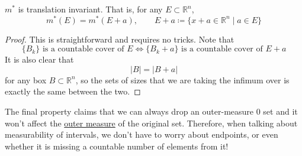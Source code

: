  \begin{theorem}
    \label{thm:translation-invariance-of-lebesgue-outer-measure}
    $m^\ast$ is translation invariant. That is, for any $E \subset \mathbb{R}^n$, 
    \begin{equation}
      m^\ast (E) = m^\ast (E + a), \qquad E + a \coloneqq \{x + a \in \mathbb{R}^n \mid a \in E \}
    \end{equation}
  \end{theorem}
  \begin{proof}
    This is straightforward and requires no tricks. Note that 
    \begin{equation}
      \{B_k\} \text{ is a countable cover of } E \iff \{B_k + a\} \text{ is a countable cover of } E + a
    \end{equation}
    It is also clear that 
    \begin{equation}
      |B| = |B + a| 
    \end{equation}
    for any box $B \subset \mathbb{R}^n$, so the sets of sizes that we are taking the infimum over is exactly the same between the two. 
  \end{proof}

  The final property claims that we can always drop an outer-measure $0$ set and it won't affect the \hyperref[def:outer-measure]{outer measure} of the original set. Therefore, when talking about measurability of intervals, we don't have to worry about endpoints, or even whether it is missing a countable number of elements from it! 

